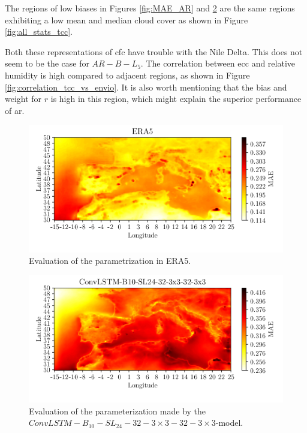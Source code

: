 The regions of low biases in Figures \ref{fig:MAE_AR} and \ref{fig:MAE_convlstm} are the same regions exhibiting a low mean and median cloud cover as shown in Figure \ref{fig:all_stats_tcc}.

Both these representations of \acrshort{cfc} have trouble with the Nile Delta. This does not seem to be the case for $AR-B-L_5$. The correlation between \acrshort{ecc} and relative humidity is high compared to adjacent regions, as shown in Figure \ref{fig:correlation_tcc_vs_envio}. It is also worth mentioning that the bias and weight for $r$ is high in this region, which might explain the superior performance of \acrshort{ar}.
\begin{figure}[ht]
    \centering
    \includegraphics{python_figs/mae_era_vs_target_test_period_2014_to_2018.png}
    \caption{Evaluation of the parametrization in ERA5.}
    \label{fig:MAE_era}
\end{figure}
\begin{figure}[ht]
    \centering
    \includegraphics{python_figs/mae_convlstm_vs_target_test_period_2014_to_2018.png}
    \caption{Evaluation of the parameterization made by the $ConvLSTM-B_{10}-SL_{24}-32-3\times3-32-3 \times3$-model.}
    \label{fig:MAE_convlstm}
\end{figure}
